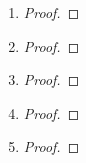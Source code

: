 \documentclass{article}
\begin{document}
\begin{enumerate}
        \item \begin{proof}
            
        \end{proof}


        \item \begin{proof}
            
        \end{proof}

        

        \item \begin{proof}
            
        \end{proof}


        \item \begin{proof}

        \end{proof}


        \item \begin{proof}
            
        \end{proof}
    
    \end{enumerate}
\end{document}
